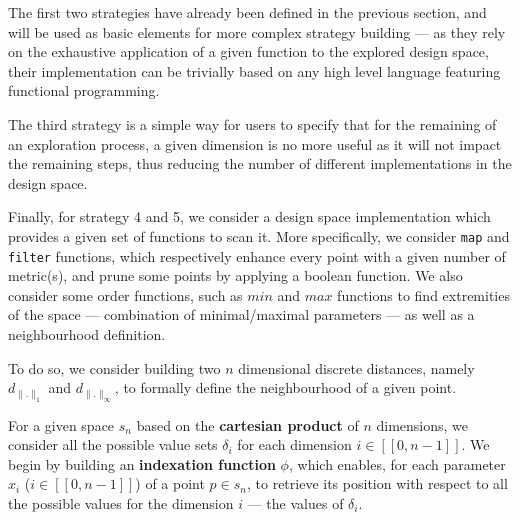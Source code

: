         The first two strategies have already been defined in the previous section, and will be used as basic elements for more complex strategy building --- as they rely on the exhaustive application of a given function to the explored design space, their implementation can be trivially based on any high level language featuring functional programming.

        The third strategy is a simple way for users to specify that for the remaining of an exploration process, a given dimension is no more useful as it will not impact the remaining steps, thus reducing the number of different implementations in the design space.

        Finally, for strategy 4 and 5, we consider a design space implementation which provides a given set of functions to scan it.
        More specifically, we consider {\tt map} and {\tt filter} functions, which respectively enhance every point with a given number of metric(s), and prune some points by applying a boolean function.
        We also consider some order functions, such as $min$ and $max$ functions to find extremities of the space --- \ie combination of minimal/maximal parameters --- as well as a neighbourhood definition.

        To do so, we consider building two $n$ dimensional discrete distances, namely $d_{\|.\|_1}$ and $d_{\|.\|_\infty}$, to formally define the neighbourhood of a given point.

        For a given space $s_n$ based on the {\bf cartesian product} of $n$ dimensions, we consider all the possible value sets $\delta_i$ for each dimension $i \in [\![0, n-1]\!]$.
        We begin by building an {\bf indexation function} $\phi$, which enables, for each parameter $x_i$ ($i \in [\![0, n-1]\!]$) of a point $p \in s_n$, to retrieve its position with respect to all the possible values for the dimension $i$ --- \ie the values of $\delta_i$.

